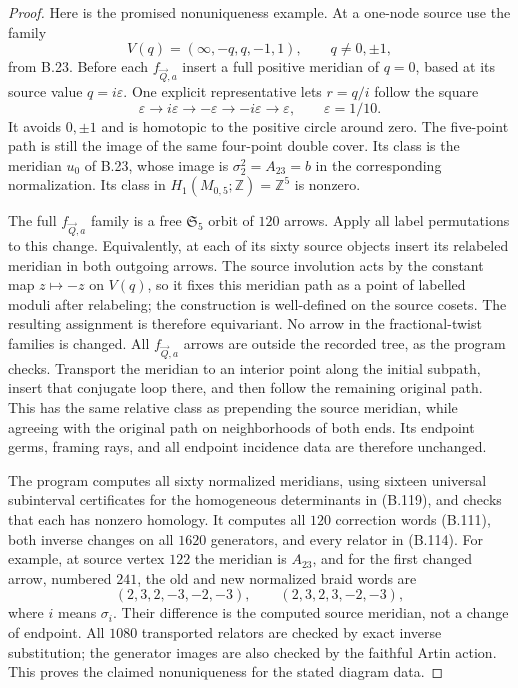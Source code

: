 \begin{proof}
Here is the promised nonuniqueness example.  At a
one-node source use the family
\[
 V(q)=(\infty,-q,q,-1,1),\qquad q\ne0,\pm1,
\]
from B.23.  Before each $f_{\vec Q,a}$ insert a full
positive meridian of $q=0$, based at its source value
$q=i\varepsilon$.  One explicit representative lets
$r=q/i$ follow the square
\[
 \varepsilon\longrightarrow i\varepsilon
   \longrightarrow-\varepsilon\longrightarrow-i\varepsilon
   \longrightarrow\varepsilon,
 \qquad\varepsilon=1/10.                                     \tag{B.119}
\]
It avoids $0,\pm1$ and is homotopic to the positive circle
around zero.  The five-point path is still the image of
the same four-point double cover.  Its class is the
meridian $u_0$ of B.23, whose image is
$\sigma_2^2=A_{23}=b$ in the corresponding normalization.
Its class in $H_1(M_{0,5};\mathbb Z)=\mathbb Z^5$ is nonzero.

The full $f_{\vec Q,a}$ family is a free
$\mathfrak S_5$ orbit of $120$ arrows.  Apply all label
permutations to this change.  Equivalently, at each of
its sixty source objects insert its relabeled meridian
in both outgoing arrows.  The source involution acts
by the constant map $z\mapsto-z$ on $V(q)$, so it fixes
this meridian path as a point of labelled moduli after
relabeling; the construction is well-defined on the
source cosets.  The resulting assignment is therefore
equivariant.  No arrow in the fractional-twist families
is changed.  All $f_{\vec Q,a}$ arrows are outside the
recorded tree, as the program checks.  Transport the meridian to an interior point along the
initial subpath, insert that conjugate loop there, and
then follow the remaining original path.  This has the
same relative class as prepending the source meridian,
while agreeing with the original path on neighborhoods
of both ends.  Its endpoint germs, framing rays, and
all endpoint incidence data are therefore unchanged.

The program computes all sixty normalized meridians,
using sixteen universal subinterval certificates
for the homogeneous determinants in (B.119), and checks that
each has nonzero homology.  It computes all $120$
correction words (B.111), both inverse changes on all
$1620$ generators, and every relator in (B.114).
For example, at source vertex $122$ the meridian is
$A_{23}$, and for the first changed arrow, numbered
$241$, the old and new normalized braid words are
\[
 (2,3,2,-3,-2,-3),\qquad (2,3,2,3,-2,-3),
                                                               \tag{B.120}
\]
where $i$ means $\sigma_i$.  Their difference is the
computed source meridian, not a change of endpoint.
All $1080$ transported relators are checked by exact
inverse substitution; the generator images are also
checked by the faithful Artin action.  This proves the
claimed nonuniqueness for the stated diagram data.


\end{proof}
